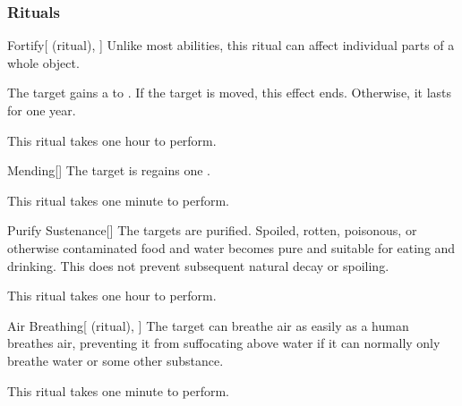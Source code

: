 \subsubsection{Rituals}


\lowercase{\hypertarget{spell:Fortify}{}}\label{spell:Fortify}
\begin{attuneability}[Rank 1]{\hypertarget{spell:Fortify}{Fortify}}[ (ritual), ]
Unlike most abilities, this ritual can affect individual parts of a whole object.

The target gains a   to .
If the target is moved, this effect ends.
Otherwise, it lasts for one year.

This ritual takes one hour to perform.
\end{attuneability}
\vspace{0.25em}



\lowercase{\hypertarget{spell:Mending}{}}\label{spell:Mending}
\begin{apability}[Rank 1]{\hypertarget{spell:Mending}{Mending}}[]
The target is regains one .

This ritual takes one minute to perform.
\end{apability}
\vspace{0.25em}



\lowercase{\hypertarget{spell:Purify Sustenance}{}}\label{spell:Purify Sustenance}
\begin{apability}[Rank 1]{\hypertarget{spell:Purify Sustenance}{Purify Sustenance}}[]
The targets are purified.
Spoiled, rotten, poisonous, or otherwise contaminated food and water becomes pure and suitable for eating and drinking.
This does not prevent subsequent natural decay or spoiling.

This ritual takes one hour to perform.
\end{apability}
\vspace{0.25em}



\lowercase{\hypertarget{spell:Air Breathing}{}}\label{spell:Air Breathing}
\begin{attuneability}[Rank 3]{\hypertarget{spell:Air Breathing}{Air Breathing}}[ (ritual), ]
The target can breathe air as easily as a human breathes air, preventing it from suffocating above water if it can normally only breathe water or some other substance.

This ritual takes one minute to perform.
\end{attuneability}
\vspace{0.25em}




